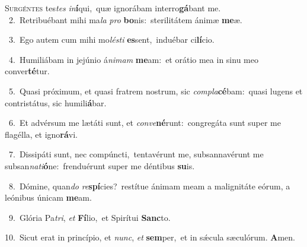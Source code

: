 \lettrine{\initial\textcolor{\initialcolor}{S}}{urgéntes} tes\textit{tes} \textit{in}\-\textbf{í}qui,~\star quæ ignorábam interro\-\textbf{gá}\-bant me.\\
{\numbfont\textcolor{\numbcolor}{~2.}}~Retribuébant mihi ma\textit{la} \textit{pro} \textbf{bo}\-nis:~\star sterilitátem ánimæ \textbf{me}\-æ.\par
{\numbfont\textcolor{\numbcolor}{~3.}}~Ego autem cum mihi mo\-\textit{lés}\-\textit{ti} \textbf{es}\-sent,~\star induébar ci\-\textbf{lí}\-cio.\par
{\numbfont\textcolor{\numbcolor}{~4.}}~Humiliábam in jejúnio á\-\textit{ni}\-\textit{mam} \textbf{me}\-am:~\star et orátio mea in sinu meo conver\-\textbf{té}\-tur.\par
{\numbfont\textcolor{\numbcolor}{~5.}}~Quasi próximum, et quasi fratrem nostrum, sic \textit{com}\-\textit{pla}\textbf{cé}bam:~\star quasi lugens et contristátus, sic humili\-\textbf{á}\-bar.\par
{\numbfont\textcolor{\numbcolor}{~6.}}~Et advérsum me lætáti sunt, et \textit{con}\-\textit{ve}\textbf{né}runt:~\star congregáta sunt super me flagélla, et igno\-\textbf{rá}\-vi.\par
{\numbfont\textcolor{\numbcolor}{~7.}}~Dissipáti sunt, nec compúncti,~\dagger tentavérunt me, subsannavérunt me subsan\-\textit{na}\-\textit{ti}\textbf{ó}ne:~\star frenduérunt super me déntibus \textbf{su}\-is.\par
{\numbfont\textcolor{\numbcolor}{~8.}}~Dómine, quan\textit{do} \textit{re}\-\textbf{spí}cies?~\star restítue ánimam meam a malignitáte eórum, a leónibus únicam \textbf{me}\-am.\par
{\numbfont\textcolor{\numbcolor}{~9.}}~Glória Pa\-\textit{tri}\-, \textit{et} \textbf{Fí}\-lio,~\star et Spirítui \textbf{Sanc}\-to.\par
{\numbfont\textcolor{\numbcolor}{10.}}~Sicut erat in princípio, et \textit{nunc}\-, \textit{et} \textbf{sem}\-per,~\star et in sǽcula sæculórum. \textbf{A}\-men.\par
